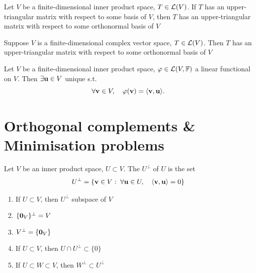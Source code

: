 \documentclass[aspectratio=169]{beamer}
\begin{document}
\begin{frame}
\begin{theorem}
Let $V$ be a finite-dimensional inner product space, $T\in\mathcal{L}(V)$. If $T$ has an upper-triangular matrix with respect to some basis of $V$, then $T$ has an upper-triangular matrix with respect to some orthonormal basis of $V$
\end{theorem}
\vfill
\begin{importanttheorem}
Suppose $V$ is a finite-dimensional complex vector space, $T\in\mathcal{L}(V)$. Then $T$ has an upper-triangular matrix with respect to some orthonormal basis of $V$
\end{importanttheorem}
\end{frame}


\begin{frame}
\begin{importanttheorem}
Let $V$ be a finite-dimensional inner product space, $\varphi\in\mathcal{L}(V,\mathbb{F})$ a linear functional on $V$. Then $\exists \mathbf{u}\in V$ unique s.t.
\[
\forall \mathbf{v}\in V,\quad \varphi(\mathbf{v})=\langle \mathbf{v},\mathbf{u}\rangle.
\]
\end{importanttheorem}
\end{frame}


\section{Orthogonal complements \& Minimisation problems}

\begin{frame}
\begin{definition}
Let $V$ be an inner product space, $U\subset V$. 
The  $U^\perp$ of $U$ is the set
\[
U^\perp =
\left\{
\mathbf{v}\in V: \;\forall \mathbf{u}\in U,\quad 
\langle\mathbf{v},\mathbf{u}\rangle =0
\right\}
\]
\end{definition}
\begin{importantproperty}
\begin{enumerate}
\item If $U\subset V$, then $U^\perp$ subspace of $V$
\item $\{\b0_V\}^\perp=V$
\item $V^\perp=\{\b0_V\}$
\item If $U\subset V$, then $U\cap U^\perp\subset\{0\}$
\item If $U\subset W\subset V$, then $W^\perp\subset U^\perp$
\end{enumerate}
\end{importantproperty}
\end{frame}
\end{document}

